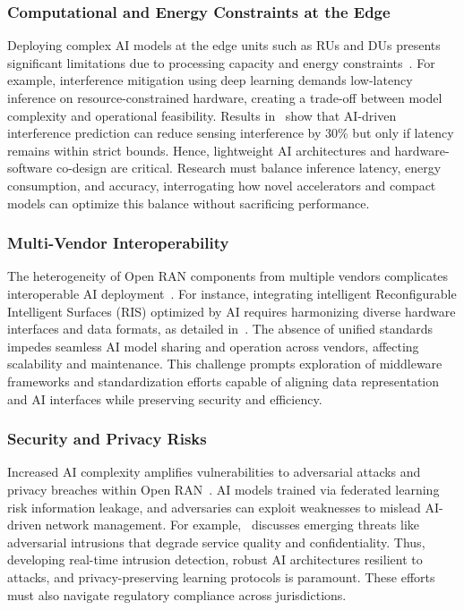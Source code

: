 \documentclass[sigconf]{acmart}
\begin{document}
\subsubsection{Computational and Energy Constraints at the Edge}
Deploying complex AI models at the edge units such as RUs and DUs presents significant limitations due to processing capacity and energy constraints~\cite{ref48,ref54}. For example, interference mitigation using deep learning demands low-latency inference on resource-constrained hardware, creating a trade-off between model complexity and operational feasibility. Results in~\cite{ref48} show that AI-driven interference prediction can reduce sensing interference by 30\% but only if latency remains within strict bounds. Hence, lightweight AI architectures and hardware-software co-design are critical. Research must balance inference latency, energy consumption, and accuracy, interrogating how novel accelerators and compact models can optimize this balance without sacrificing performance.

\subsubsection{Multi-Vendor Interoperability}
The heterogeneity of Open RAN components from multiple vendors complicates interoperable AI deployment~\cite{ref49,ref54}. For instance, integrating intelligent Reconfigurable Intelligent Surfaces (RIS) optimized by AI requires harmonizing diverse hardware interfaces and data formats, as detailed in~\cite{ref49}. The absence of unified standards impedes seamless AI model sharing and operation across vendors, affecting scalability and maintenance. This challenge prompts exploration of middleware frameworks and standardization efforts capable of aligning data representation and AI interfaces while preserving security and efficiency.

\subsubsection{Security and Privacy Risks}
Increased AI complexity amplifies vulnerabilities to adversarial attacks and privacy breaches within Open RAN~\cite{ref50,ref54}. AI models trained via federated learning risk information leakage, and adversaries can exploit weaknesses to mislead AI-driven network management. For example,~\cite{ref50} discusses emerging threats like adversarial intrusions that degrade service quality and confidentiality. Thus, developing real-time intrusion detection, robust AI architectures resilient to attacks, and privacy-preserving learning protocols is paramount. These efforts must also navigate regulatory compliance across jurisdictions.
\end{document}
